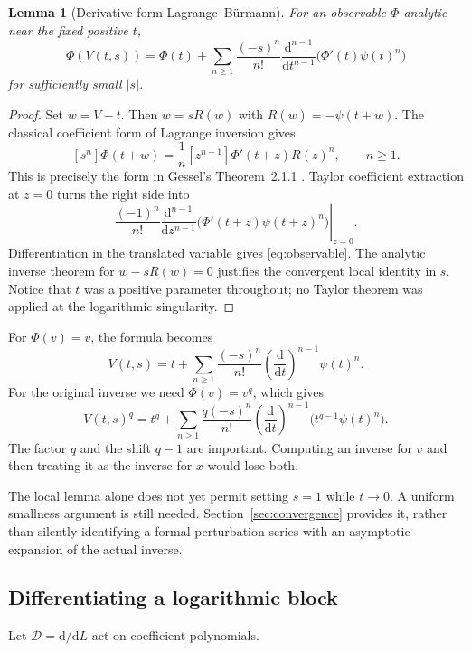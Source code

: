 \documentclass[11pt,a4paper]{article}
\numberwithin{equation}{section}
\newtheorem{lemma}[theorem]{Lemma}
\theoremstyle{definition}
\newcommand{\dd}{\mathrm d}
\newcommand{\D}{\mathcal D}
\begin{document}
\begin{lemma}[Derivative-form Lagrange--B\"urmann]\label{lem:lagrange}
For an observable $\Phi$ analytic near the fixed positive $t$,
\begin{equation}\label{eq:observable}
 \Phi(V(t,s))=\Phi(t)+
 \sum_{n\ge1}\frac{(-s)^n}{n!}
 \frac{\dd^{n-1}}{\dd t^{n-1}}
       \bigl(\Phi'(t)\psi(t)^n\bigr)
\end{equation}
for sufficiently small $|s|$.
\end{lemma}
\begin{proof}
Set $w=V-t$. Then $w=sR(w)$ with $R(w)=-\psi(t+w)$.
The classical coefficient form of Lagrange inversion gives
\[
 [s^n]\Phi(t+w)
 =\frac1n[z^{n-1}]\Phi'(t+z)R(z)^n,
 \qquad n\ge1.
\]
This is precisely the form in Gessel's Theorem~2.1.1
\cite{gessel}. Taylor coefficient extraction at $z=0$ turns the right
side into
\[
 \frac{(-1)^n}{n!}
 \left.\frac{\dd^{n-1}}{\dd z^{n-1}}
   \bigl(\Phi'(t+z)\psi(t+z)^n\bigr)\right|_{z=0}.
\]
Differentiation in the translated variable gives \eqref{eq:observable}.
The analytic inverse theorem for $w-sR(w)=0$ justifies the convergent
local identity in $s$. Notice that $t$ was a positive parameter throughout;
no Taylor theorem was applied at the logarithmic singularity.
\end{proof}

For $\Phi(v)=v$, the formula becomes
\begin{equation}\label{eq:near-identity}
 V(t,s)=t+\sum_{n\ge1}\frac{(-s)^n}{n!}
                  \left(\frac{\dd}{\dd t}\right)^{n-1}\psi(t)^n.
\end{equation}
For the original inverse we need $\Phi(v)=v^q$, which gives
\begin{equation}\label{eq:power-observable}
 V(t,s)^q=t^q+
 \sum_{n\ge1}\frac{q(-s)^n}{n!}
 \left(\frac{\dd}{\dd t}\right)^{n-1}
           \bigl(t^{q-1}\psi(t)^n\bigr).
\end{equation}
The factor $q$ and the shift $q-1$ are important. Computing an inverse for
$v$ and then treating it as the inverse for $x$ would lose both.

The local lemma alone does not yet permit setting $s=1$ while $t\to0$.
A uniform smallness argument is still needed. Section~\ref{sec:convergence}
provides it, rather than silently identifying a formal perturbation series
with an asymptotic expansion of the actual inverse.

\subsection{Differentiating a logarithmic block}
Let $\D=\dd/\dd L$ act on coefficient polynomials.
\end{document}

